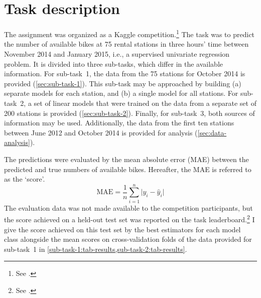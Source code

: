 \section{Task description}
\label{sec:task-description}

The assignment was organized as a Kaggle competition.\footnote{See .}
The task was to predict the number of available bikes at 75 rental stations in three
hours' time between November 2014 and January 2015, i.e., a supervised univariate
regression problem.
It is divided into three sub-tasks, which differ in the available information.
For sub-task~1, the data from the 75 stations for October 2014 is provided
(\cref{sec:sub-task-1}).
This sub-task may be approached by building (a) separate models for each station, and
(b) a single model for all stations.
For sub-task~2, a set of linear models that were trained on the data from a separate
set of 200 stations is provided (\cref{sec:sub-task-2}).
Finally, for sub-task~3, both sources of information may be used.
Additionally, the data from the first ten stations between June 2012 and October 2014
is provided for analysis (\cref{sec:data-analysis}).

The predictions were evaluated by the mean absolute error (MAE) between the predicted
and true numbers of available bikes.
Hereafter, the MAE is referred to as the `score'.
\begin{equation}
  \text{MAE} = \frac{1}{n} \sum_{i = 1}^n \lvert y_i - \hat{y}_i \rvert
\end{equation}
The evaluation data was not made available to the competition participants, but the
score achieved on a held-out test set was reported on the task
leaderboard.\footnote{See .} I give the score achieved on this test
set by the best estimators for each model class alongside the mean scores on
cross-validation folds of the data provided for sub-task~1 in
\cref{sub-task-1:tab-results,sub-task-2:tab-results}.

